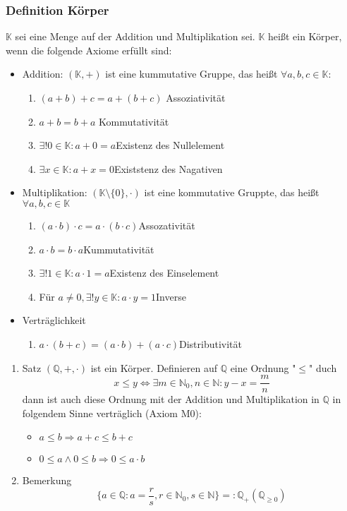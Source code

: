 \documentclass[11pt]{article}
\DeclareMathOperator{\Forall}{\forall}%
\begin{document}
\subsubsection{Definition Körper}
\label{sec-2-4-3}
$\mathbb{K}$ sei eine Menge auf der Addition und Multiplikation sei. $\mathbb{K}$ heißt ein Körper, wenn die folgende Axiome erfüllt sind:
\begin{itemize}
\item Addition: $(\mathbb{K}, +)$ ist eine kummutative Gruppe, das heißt $\Forall a,b,c\in \mathbb{K}$:
\begin{enumerate}
\item \((a+b)+c = a+(b+c)\) \hfill Assoziativität
\item \(a+b = b+a\) \hfill Kommutativität
\item \(\exists! 0\in\mathbb{K}:a+0 = a\)\hfill Existenz des Nullelement
\item \(\exists x\in\mathbb{K}: a+x = 0\)\hfill Existstenz des Nagativen
\end{enumerate}
\item Multiplikation: $(\mathbb{K}\setminus\{0\},\cdot)$ ist eine kommutative Gruppte, das heißt $\Forall a,b,c\in\mathbb{K}$
\begin{enumerate}
\item \((a\cdot b)\cdot c = a\cdot(b\cdot c)\)\hfill Assozativität
\item \(a\cdot b = b\cdot a\)\hfill Kummutativität
\item \(\exists!1\in\mathbb{K}:a\cdot 1 = a\)\hfill Existenz des Einselement
\item Für \(a\neq 0, \exists! y\in\mathbb{K}:a\cdot y = 1\)\hfill Inverse
\end{enumerate}
\item Verträglichkeit
\begin{enumerate}
\item \(a\cdot (b + c) = (a\cdot b)+ (a\cdot c)\)\hfill Distributivität
\end{enumerate}
\end{itemize}
\begin{enumerate}
\item Satz
\label{sec-2-4-3-1}
$(\mathbb{Q},+,\cdot)$ ist ein Körper. Definieren auf $\mathbb{Q}$ eine Ordnung "$\leq$" duch \[x\leq y \Leftrightarrow\exists m\in\mathbb{N}_0, n\in\mathbb{N}:y - x = \frac{m}{n}\]
dann ist auch diese Ordnung mit der Addition und Multiplikation in $\mathbb{Q}$ in folgendem Sinne verträglich (Axiom M0):
\begin{itemize}
\item \(a\leq b\Rightarrow a+c \leq b + c\)
\item \(0\leq a\wedge 0\leq b \Rightarrow 0\leq a\cdot b\)
\end{itemize}
\item Bemerkung
\label{sec-2-4-3-2}
\[\{a\in\mathbb{Q}: a = \frac{r}{s},r\in\mathbb{N}_0,s\in\mathbb{N}\} =: \mathbb{Q}_+ (\mathbb{Q}_{\geq 0})\]
\end{enumerate}
\end{document}
